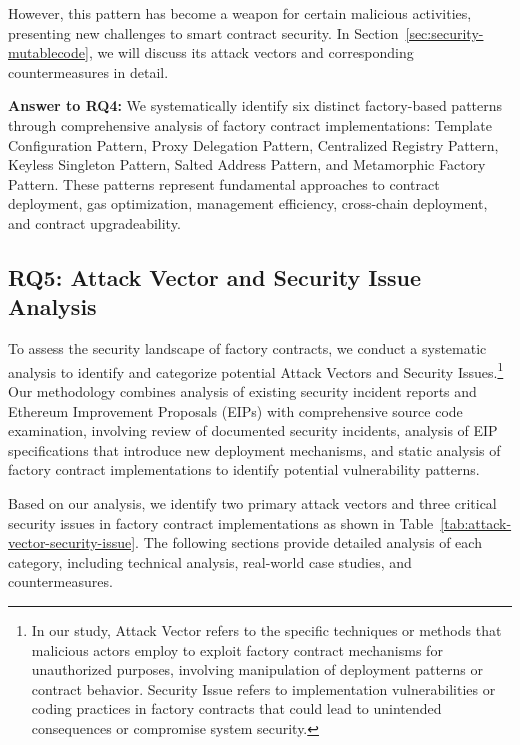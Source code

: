 \documentclass[acmsmall, screen]{acmart}
\begin{document}
	However, this pattern has become a weapon for certain malicious activities, presenting new
	challenges to smart contract security. In Section~\ref{sec:security-mutablecode}, we will
	discuss its attack vectors and corresponding countermeasures in detail.

	\begin{answerbox}
		\textbf{Answer to RQ4:} We systematically identify six distinct factory-based patterns
		through comprehensive analysis of factory contract implementations: Template Configuration Pattern,
		Proxy Delegation Pattern, Centralized Registry Pattern, Keyless Singleton Pattern, Salted Address
		Pattern, and Metamorphic Factory Pattern. These patterns represent fundamental approaches to
		contract deployment, gas optimization, management efficiency, cross-chain deployment, and contract
		upgradeability.
	\end{answerbox}

	\subsection{RQ5: Attack Vector and Security Issue Analysis}
	\label{sec:rq5securityrisks} To assess the security landscape of factory contracts, we conduct a
	systematic analysis to identify and categorize potential Attack Vectors and Security Issues.\footnote{In
	our study, Attack Vector refers to the specific techniques or methods that malicious actors employ
	to exploit factory contract mechanisms for unauthorized purposes, involving manipulation of
	deployment patterns or contract behavior. Security Issue refers to implementation vulnerabilities
	or coding practices in factory contracts that could lead to unintended consequences or compromise
	system security.} Our methodology combines analysis of existing security incident reports and
	Ethereum Improvement Proposals (EIPs) with comprehensive source code examination, involving review
	of documented security incidents, analysis of EIP specifications that introduce new deployment
	mechanisms, and static analysis of factory contract implementations to identify potential vulnerability
	patterns.

	

	Based on our analysis, we identify two primary attack vectors and three critical security issues
	in factory contract implementations as shown in Table~\ref{tab:attack-vector-security-issue}.
	The following sections provide detailed analysis of each category, including technical analysis,
	real-world case studies, and countermeasures.
\end{document}
